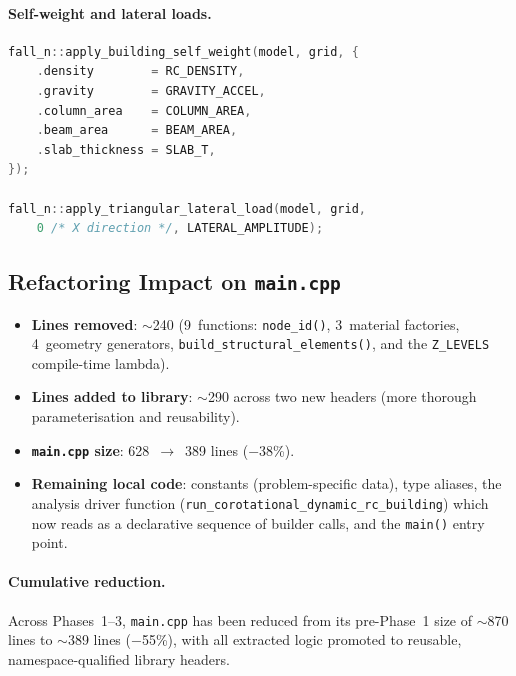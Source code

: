 \paragraph{Self-weight and lateral loads.}
\begin{lstlisting}[language=C++,basicstyle=\small\ttfamily]
fall_n::apply_building_self_weight(model, grid, {
    .density        = RC_DENSITY,
    .gravity        = GRAVITY_ACCEL,
    .column_area    = COLUMN_AREA,
    .beam_area      = BEAM_AREA,
    .slab_thickness = SLAB_T,
});

fall_n::apply_triangular_lateral_load(model, grid,
    0 /* X direction */, LATERAL_AMPLITUDE);
\end{lstlisting}

\subsection{Refactoring Impact on \texttt{main.cpp}}
\label{sec:phase3-refactoring}

\begin{itemize}
  \item \textbf{Lines removed}: $\sim$240 (9~functions:
        \texttt{node\_id()}, 3~material factories, 4~geometry
        generators, \texttt{build\_structural\_elements()}, and the
        \texttt{Z\_LEVELS} compile-time lambda).
  \item \textbf{Lines added to library}: $\sim$290 across two new
        headers (more thorough parameterisation and reusability).
  \item \textbf{\texttt{main.cpp} size}: 628~$\to$~389 lines
        ($-$38\%).
  \item \textbf{Remaining local code}: constants (problem-specific
        data), type aliases, the analysis driver function
        (\texttt{run\_corotational\_dynamic\_rc\_building}) which now
        reads as a declarative sequence of builder calls, and the
        \texttt{main()} entry point.
\end{itemize}

\paragraph{Cumulative reduction.}
Across Phases~1--3, \texttt{main.cpp} has been reduced from its
pre-Phase~1 size of $\sim$870 lines to $\sim$389 lines ($-$55\%),
with all extracted logic promoted to reusable, namespace-qualified
library headers.


